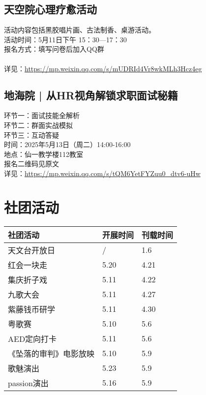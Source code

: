 \documentclass[letterpaper, 12pt]{article}
\begin{document}
\begin{multicols}{2}
\subsection{天空院心理疗愈活动} %
活动内容包括黑胶唱片画、古法制香、桌游活动。
\\活动时间：5月11日下午 15：30—17：30
\\报名方式：填写问卷后加入QQ群
\\
\\详见：\url{https://mp.weixin.qq.com/s/mUDRId4Vr8wkMLh3Hcz4eg}

\subsection{地海院 | 从HR视角解锁求职面试秘籍} %
环节一：面试技能全解析
\\环节二：群面实战模拟
\\环节三：互动答疑
\\时间：2025年5月13日（周二）14:00-16:00
\\地点：仙一教学楼112教室
\\报名二维码见原文
\\详见：\url{https://mp.weixin.qq.com/s/tQM6YetFYZuu0_dtv6-uHw}

\section{社团活动}
\begin{tabular}{|>{\centering\arraybackslash}m{}|m{}|m{}|}
    \hline
    社团活动 & 开展时间 & 刊载时间\\
    \hline\hline
    天文台开放日 & / & 1.6\\
    红会一块走 & 5.20 & 4.21\\
    集庆折子戏 & 5.11 & 4.22\\
    九歌大会 & 5.11 & 4.27\\
    紫藤钱币研学 & 5.11 & 4.30\\
    粤歌赛 & 5.10 & 5.6\\
    AED定向打卡 & 5.11 & 5.6\\
    《坠落的审判》电影放映 & 5.10 & 5.9\\
    歌魅演出 & 5.23 & 5.9\\
    passion演出 & 5.16 & 5.9\\
    \hline
\end{tabular}


\end{multicols}
\end{document}
